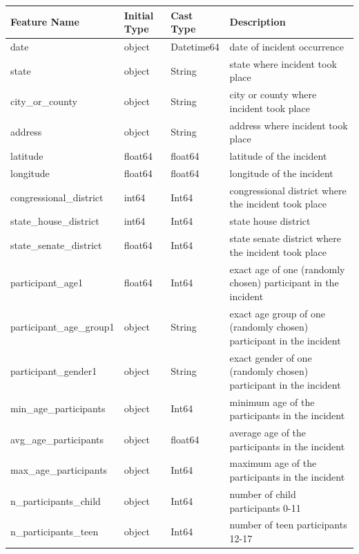 \documentclass[10pt,a4paper]{report}
\begin{document}
\begin{table}[t]
	\centering
	\begin{small}
	\begin{tabular}{|l|l|l|p{7.7cm}|}
		\hline
		\textbf{Feature Name} & \textbf{Initial Type} & \textbf{Cast Type} & \textbf{Description}\\
		\hline
		date & object & Datetime64 & date of incident occurrence\\
		\hline
		state & object & String & state where incident took place\\
		\hline
		city\_or\_county & object & String & city or county where incident took place\\
		\hline
		address & object & String & address where incident took place\\
		\hline
		latitude & float64 & float64 & latitude of the incident\\
		\hline
		longitude & float64 & float64 & longitude of the incident\\
		\hline
		congressional\_district & int64 & Int64 & congressional district where the incident took place\\
		\hline
		state\_house\_district & int64 & Int64 & state house district\\
		\hline
		state\_senate\_district & float64 & Int64 & state senate district where the incident took place\\
		\hline
		participant\_age1 & float64 & Int64 & exact age of one (randomly chosen) participant in the incident\\
		\hline
		participant\_age\_group1 & object & String & exact age group of one (randomly chosen) participant in the incident\\
		\hline
		participant\_gender1 & object & String & exact gender of one (randomly chosen) participant in the incident\\
		\hline
		min\_age\_participants & object & Int64 & minimum age of the participants in the incident\\
		\hline
		avg\_age\_participants & object & float64 & average age of the participants in the incident\\
		\hline
		max\_age\_participants & object & Int64 & maximum age of the participants in the incident\\
		\hline
		n\_participants\_child & object & Int64 & number of child participants 0-11\\
		\hline
		n\_participants\_teen & object & Int64 & number of teen participants 12-17\\

\end{tabular}
\end{small}
\end{table}
\end{document}
